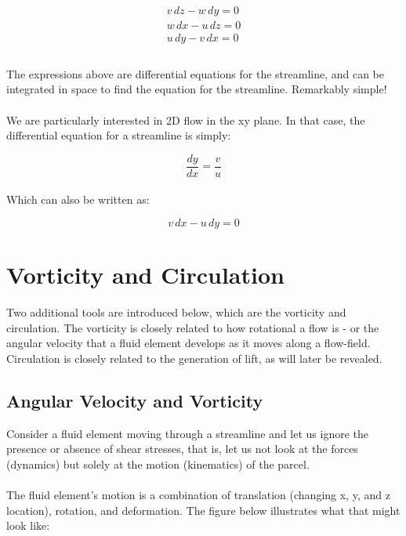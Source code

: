 \documentclass[11pt]{article}
\begin{document}
\begin{equation*}
    \begin{matrix}
        v\,dz - w\,dy = 0\\
        w\,dx - u\,dz = 0\\
        u\,dy - v\,dx = 0\\ 
    \end{matrix}
\end{equation*}\\
\noindent
The expressions above are differential equations for the streamline, and can be integrated in space to find the equation for the streamline. Remarkably simple! \\ \\
\noindent
We are particularly interested in 2D flow in the xy plane. In that case, the differential equation for a streamline is simply:

\begin{equation*}
    \frac{dy}{dx} = \frac{v}{u}
\end{equation*} \\
\noindent
Which can also be written as:

\begin{equation*}
    v\,dx - u\,dy = 0
\end{equation*}
\pagebreak

\section{Vorticity and Circulation}
Two additional tools are introduced below, which are the vorticity and circulation. The vorticity is closely related to how rotational a flow is - or the angular velocity that a fluid element develops as it moves along a flow-field. Circulation is closely related to the generation of lift, as will later be revealed.

\subsection{Angular Velocity and Vorticity}
Consider a fluid element moving through a streamline and let us ignore the presence or absence of shear stresses, that is, let us not look at the forces (dynamics) but solely at the motion (kinematics) of the parcel. \\ \\
\noindent
The fluid element's motion is a combination of translation (changing x, y, and z location), rotation, and deformation. The figure below illustrates what that might look like: \\ \\ 
\end{document}
